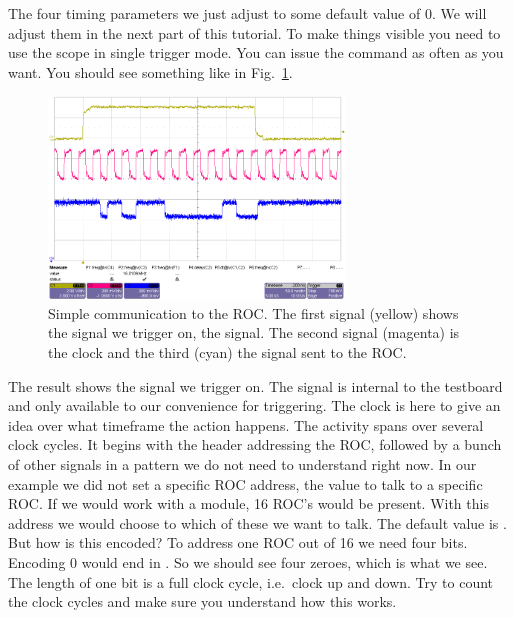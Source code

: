 \bigskip

The four timing parameters we just adjust to some default value of 0. We will adjust them in the next part of this tutorial.
To make things visible you need to use the scope in single trigger mode. You can issue the  command as often as you want. You should see something like in Fig.~\ref{fig:tut_scope2}.

\begin{figure}[h]
    \begin{center}
	\includegraphics[width=0.7\textwidth]{img/tut_scope2.png}
	\caption{Simple communication to the ROC. The first signal (yellow) shows the signal we trigger on, the  signal. The second signal (magenta) is the clock and the third (cyan) the signal sent to the ROC.}
	\label{fig:tut_scope2}
    \end{center}
\end{figure}

The result shows the signal we trigger on. The  signal is internal to the testboard and only available to our convenience for triggering. The clock is here to give an idea over what timeframe the action happens. The activity spans over several clock cycles. It begins with the header addressing the ROC, followed by a bunch of other signals in a pattern we do not need to understand right now. In our example we did not set a specific ROC address, the value to talk to a specific ROC. If we would work with a module, 16 ROC's would be present. With this address we would choose to which of these we want to talk. The default value is . But how is this encoded? To address one ROC out of 16 we need four bits. Encoding 0 would end in . So we should see four zeroes, which is what we see. The length of one bit is a full clock cycle, i.e.~clock up and down. Try to count the clock cycles and make sure you understand how this works.

